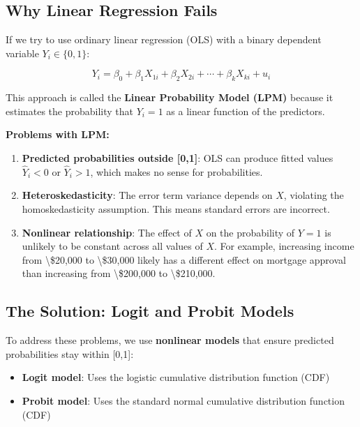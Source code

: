 \documentclass[
  12pt,
  letterpaper,
]{scrbook}
\providecommand{\tightlist}{%
  \setlength{\itemsep}{0pt}\setlength{\parskip}{0pt}}
\renewcommand{\tightlist}{\setlength{\itemsep}{0.5\baselineskip}\setlength{\parskip}{0.2\baselineskip}}
\theoremstyle{plain}
\theoremstyle{definition}
\theoremstyle{remark}
\begin{document}
\subsection{Why Linear Regression
Fails}\label{why-linear-regression-fails}

If we try to use ordinary linear regression (OLS) with a binary
dependent variable \(Y_i \in \{0,1\}\):

\[
Y_i = \beta_0 + \beta_1 X_{1i} + \beta_2 X_{2i} + \cdots + \beta_k X_{ki} + u_i
\]

This approach is called the \textbf{Linear Probability Model (LPM)}
because it estimates the probability that \(Y_i = 1\) as a linear
function of the predictors.

\textbf{Problems with LPM:}

\begin{enumerate}
\def\labelenumi{\arabic{enumi}.}
\item
  \textbf{Predicted probabilities outside {[}0,1{]}}: OLS can produce
  fitted values \(\hat{Y}_i < 0\) or \(\hat{Y}_i > 1\), which makes no
  sense for probabilities.
\item
  \textbf{Heteroskedasticity}: The error term variance depends on \(X\),
  violating the homoskedasticity assumption. This means standard errors
  are incorrect.
\item
  \textbf{Nonlinear relationship}: The effect of \(X\) on the
  probability of \(Y=1\) is unlikely to be constant across all values of
  \(X\). For example, increasing income from \textbackslash\$20,000 to
  \textbackslash\$30,000 likely has a different effect on mortgage
  approval than increasing from \textbackslash\$200,000 to
  \textbackslash\$210,000.
\end{enumerate}

\subsection{The Solution: Logit and Probit
Models}\label{the-solution-logit-and-probit-models}

To address these problems, we use \textbf{nonlinear models} that ensure
predicted probabilities stay within {[}0,1{]}:

\begin{itemize}
\tightlist
\item
  \textbf{Logit model}: Uses the logistic cumulative distribution
  function (CDF)
\item
  \textbf{Probit model}: Uses the standard normal cumulative
  distribution function (CDF)
\end{itemize}
\end{document}
